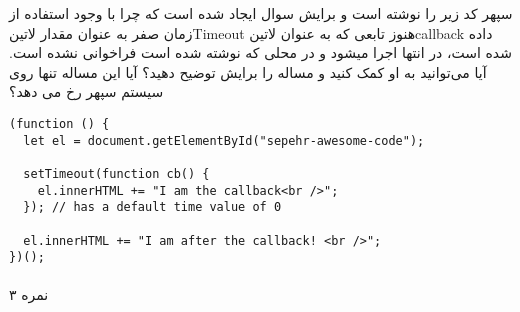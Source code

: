 \documentclass[../main.tex]{subfiles}
\begin{document}

سپهر کد زیر را نوشته است و برایش سوال ایجاد شده است که چرا با وجود استفاده از زمان صفر به عنوان مقدار ‌لاتین{Timeout}
هنوز تابعی که به عنوان ‌لاتین{callback} داده شده است، در انتها اجرا میشود و در محلی که نوشته شده است فراخوانی نشده است. آیا می‌توانید به او کمک کنید و مساله را برایش توضیح دهید؟
آیا این مساله تنها روی سیستم سپهر رخ می دهد؟

\begin{latin}
\begin{verbatim}
(function () {
  let el = document.getElementById("sepehr-awesome-code");

  setTimeout(function cb() {
    el.innerHTML += "I am the callback<br />";
  }); // has a default time value of 0

  el.innerHTML += "I am after the callback! <br />";
})();
\end{verbatim}
\end{latin}

\paragraph{}
۳ نمره
\end{document}
